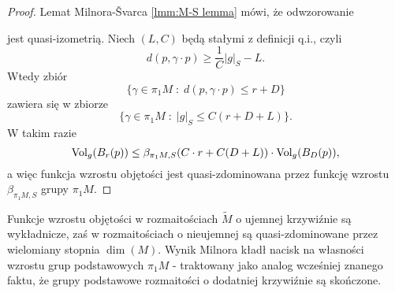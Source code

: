 \begin{proof}
  Lemat Milnora-\v{S}varca \ref{lmm:M-S lemma} mówi, że odwzorowanie
  \begin{center}
  \end{center}
  jest quasi-izometrią. Niech $(L,C)$ będą stałymi z definicji q.i., czyli 
  $$d(p,\gamma\cdot p)\geq \frac{1}{C}|g|_S-L.$$
  Wtedy zbiór 
  $$\{\gamma\in\pi_1M\;:\;d(p,\gamma\cdot p)\leq r+D\}$$
  zawiera się w zbiorze
  $$\{\gamma\in\pi_1M\;:\;|g|_S\leq C(r+D+L)\}.$$
  W takim razie
  $$\operatorname{Vol}_g(B_r(p))\leq\beta_{\pi_1M,S}(C\cdot r+C(D+L))\cdot \operatorname{Vol}_g(B_D(p)),$$
  a więc funkcja wzrostu objętości jest quasi-zdominowana przez funkcję wzrostu $\beta_{\pi_1M,S}$ grupy $\pi_1M$.
\end{proof}

Funkcje wzrostu objętości w rozmaitościach $\widetilde{M}$ o ujemnej krzywiźnie są wykładnicze, zaś w rozmaitościach o nieujemnej są quasi-zdominowane przez wielomiany stopnia $\dim(M)$. Wynik Milnora kładł nacisk na własności wzrostu grup podstawowych $\pi_1M$ - traktowany jako analog wcześniej znanego faktu, że grupy podstawowe rozmaitości o dodatniej krzywiźnie są skończone.

